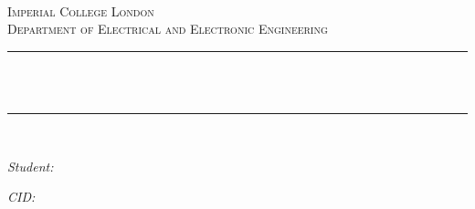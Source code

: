 \begin{titlepage}

\newcommand{\HRule}{\rule{\linewidth}{0.5mm}} %




\begin{center} %

\textsc{\huge \reporttype}\\[1.5cm] 
\textsc{\LARGE Imperial College London}\\[0.5cm] 
\textsc{\Large Department of Electrical and Electronic Engineering}\\[0.5cm] %

    \vspace{1cm}

\HRule \\[0.4cm]
{ \huge \bfseries \reporttitle}\\ %
\HRule \\[1.5cm]
\end{center}
\begin{center}
\vspace{1cm}
\begin{minipage}[t]{0.4\hsize}
    \begin{flushleft} \Large
    \textit{Student:}\\
    \reportauthor
    \end{flushleft}
    \vspace{0.4cm}
    
    \begin{flushleft} \Large
    \textit{CID:}\\
    \cid %
    \end{flushleft}
    \vspace{1cm}


\end{minipage}
\end{center}
\end{titlepage}
